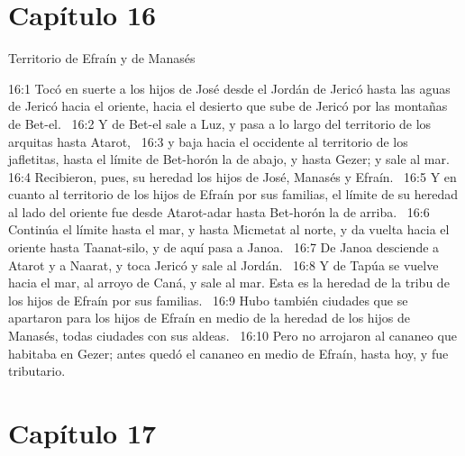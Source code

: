 \section*{Capítulo 16 }
Territorio de Efraín y de Manasés  

16:1 Tocó en suerte a los hijos de José desde el Jordán de Jericó hasta las aguas de Jericó hacia el oriente, hacia el desierto que sube de Jericó por las montañas de Bet-el.  
16:2 Y de Bet-el sale a Luz, y pasa a lo largo del territorio de los arquitas hasta Atarot,  
16:3 y baja hacia el occidente al territorio de los jafletitas, hasta el límite de Bet-horón la de abajo, y hasta Gezer; y sale al mar.  
16:4 Recibieron, pues, su heredad los hijos de José, Manasés y Efraín.  
16:5 Y en cuanto al territorio de los hijos de Efraín por sus familias, el límite de su heredad al lado del oriente fue desde Atarot-adar hasta Bet-horón la de arriba.  
16:6 Continúa el límite hasta el mar, y hasta Micmetat al norte, y da vuelta hacia el oriente hasta Taanat-silo, y de aquí pasa a Janoa.  
16:7 De Janoa desciende a Atarot y a Naarat, y toca Jericó y sale al Jordán.  
16:8 Y de Tapúa se vuelve hacia el mar, al arroyo de Caná, y sale al mar. Esta es la heredad de la tribu de los hijos de Efraín por sus familias.  
16:9 Hubo también ciudades que se apartaron para los hijos de Efraín en medio de la heredad de los hijos de Manasés, todas ciudades con sus aldeas.  
16:10 Pero no arrojaron al cananeo que habitaba en Gezer; antes quedó el cananeo en medio de Efraín, hasta hoy, y fue tributario.  
\section*{Capítulo 17}

